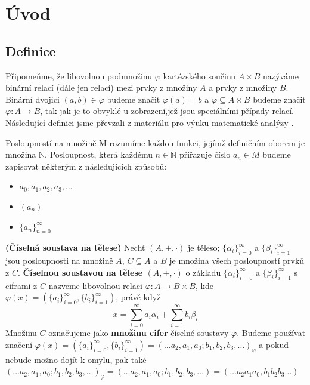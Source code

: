 \documentclass[czech,bachelor,dept470,male]{diploma}
\newcommand{\poslbeta}{\{\beta_i\}_{i=1}^{\infty}}
\newcommand{\poslalpha}{\{\alpha_i\}_{i=0}^{\infty}}
\begin{document}
\MakeTitlePages
\section{Úvod}
\subsection{Definice}
Připomeňme, že libovolnou podmnožinu $\varphi$ kartézského součinu $A \times B$ nazýváme binární relací (dále jen relací) mezi prvky z množiny $A$ a prvky z množiny $B$. Binární dvojici $(a,b)\in \varphi$ budeme značit $\varphi(a) = b$ a $\varphi \subseteq A \times B$ budeme značit $\varphi : A \rightarrow B$, tak jak je to obvyklé u zobrazení,\newline jež jsou speciálními případy relací.
\newline Následující definici jsme převzali z materiálu pro výuku matematické analýzy \cite{maUniverse}.
\begin{definition}
	Posloupností na množině M rozumíme každou funkci, jejímž definičním oborem je množina $\mathbb{N}$. Posloupnost, která každému $n \in \mathbb{N}$ přiřazuje číslo $a_n \in M$ budeme zapisovat některým z následujících způsobů:
	\begin{itemize}
		\item $a_0, a_1, a_2, a_3,\dots$
		\item $(a_n)$
		\item $\{a_n\}_{n=0}^{\infty}$
	\end{itemize}
\end{definition}
\begin{definition}\label{d2} \textbf{(Číselná soustava na tělese)}
	Nechť $(A,+,\cdot)$ je těleso; $\poslalpha$ a $\poslbeta$ jsou posloupnosti na množině $A$, $C\subseteq A$ a $B$ je množina všech posloupností prvků z $C$.
	\newline\textbf{Číselnou soustavou na tělese $(A,+,\cdot)$} o základu $\poslalpha$ a $\poslbeta$ s ciframi z $C$ nazveme libovolnou relaci $\varphi : A \rightarrow B\times B$, kde $\varphi(x)=\left(\{a_{i}\}_{i=0}^{\infty},\{b_{i}\}_{i=1}^{\infty}\right)$, právě když
	$$x = \sum_{i=0}^{\infty} a_{i}\alpha_{i} + \sum_{i=1}^{\infty} b_{i}\beta_{i}$$
	Množinu $C$ označujeme jako \textbf{množinu cifer} číselné soustavy $\varphi$. Budeme používat značení $\varphi(x) = \left(\{a_{i}\}_{i=0}^{\infty},\{b_{i}\}_{i=1}^{\infty}\right) = (\dots a_2,a_1,a_0;b_1, b_2, b_3, \dots)_{\varphi}$ a pokud nebude možno dojít k omylu, pak také $(\dots a_2,a_1,a_0;b_1, b_2, b_3, \dots)_{\varphi} = (\dots a_2,a_1,a_0;b_1, b_2, b_3, \dots) = (\dots a_2a_1a_0,b_1 b_2 b_3 \dots)$
\end{definition}
\end{document}
